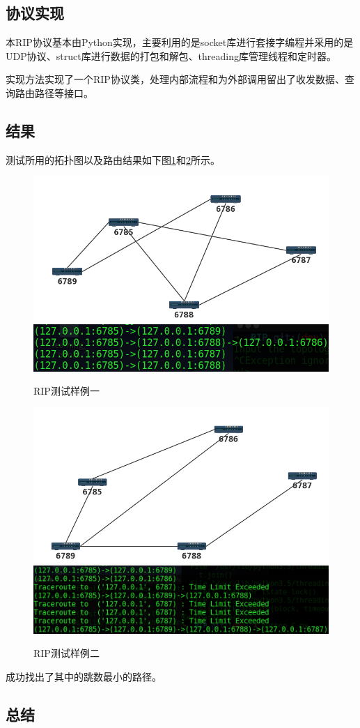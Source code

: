 	\subsection{协议实现} %
	\label{sub:协议实现}
		本RIP协议基本由Python实现，主要利用的是socket库进行套接字编程并采用的是UDP协议、struct库进行数据的打包和解包、threading库管理线程和定时器。
		\par 实现方法实现了一个RIP协议类，处理内部流程和为外部调用留出了收发数据、查询路由路径等接口。
	\subsection{结果} %
	\label{sub:结果}
		测试所用的拓扑图以及路由结果如下图\ref{fig:ripTest1}和\ref{fig:ripTest2}所示。
		\begin{figure}[H]
			\centering
			\includegraphics[scale=0.4]{imgs/topo1/tpop1.png}
			\includegraphics[scale=0.5]{imgs/ripTest1.PNG}
			\caption{RIP测试样例一}
			\label{fig:ripTest1}
		\end{figure}
		\begin{figure}[H]
			\centering
			\includegraphics[scale=0.4]{imgs/topo1/topo2.png}
			\includegraphics[scale=0.4]{imgs/ripTest2.PNG}
			\caption{RIP测试样例二}
			\label{fig:ripTest2}
		\end{figure}
		成功找出了其中的跳数最小的路径。
	\subsection{总结} %
	\label{sub:总结}
	


